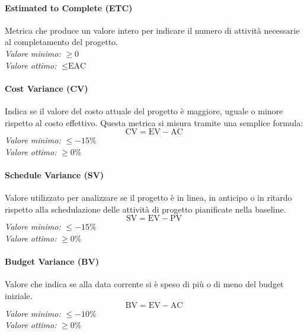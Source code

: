 \paragraph{Estimated to Complete (ETC)}
Metrica che produce un valore intero per indicare il numero di attività necessarie al completamento del progetto.\\
\textit{Valore minimo:} $\ge 0$\\
\textit{Valore ottimo:} $\le \text{EAC}$
\paragraph{Cost Variance (CV)}
Indica se il valore del costo attuale del progetto è maggiore, uguale o minore rispetto al costo effettivo.
Questa metrica si misura tramite una semplice formula:
\begin{equation*}
\text{CV}=\text{EV}-\text{AC}
\end{equation*}
\textit{Valore minimo:} $\le -15\%$\\
\textit{Valore ottimo:} $\ge 0\%$
\paragraph{Schedule Variance (SV)}
Valore utilizzato per analizzare se il progetto è in linea, in anticipo o in ritardo rispetto alla schedulazione delle attività di progetto pianificate nella baseline.
\begin{equation*}
\text{SV}=\text{EV}-\text{PV}
\end{equation*}
\textit{Valore minimo:} $\le -15\%$\\
\textit{Valore ottimo:} $\ge 0\%$
\paragraph{Budget Variance (BV)}
Valore che indica se alla data corrente si è speso di più o di meno del budget iniziale.
\begin{equation*}
\text{BV}=\text{EV}-\text{AC}
\end{equation*}
\textit{Valore minimo:} $\le -10\%$\\
\textit{Valore ottimo:} $\ge 0\%$

